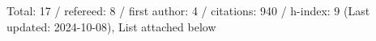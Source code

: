 Total: 17 / refereed: 8 / first author: 4 / citations: 940 / h-index: 9 (Last updated: 2024-10-08), List attached below